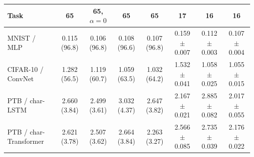 \begin{tabular}{l cccc ccc}
\toprule
Task & \ANPb{} 65 & \ANPb{} 65, $\alpha{=}0$ & \ANP{} 65 & \INP{} 65 & \ANPb{} 17 & \ANP{} 16 & \INP{} 16 \\
\midrule
MNIST / MLP & 0.115 (96.8) & 0.106 (96.8) & 0.108 (96.6) & 0.107 (96.8) & 0.159$\pm$0.007 & 0.112$\pm$0.003 & 0.107$\pm$0.004 \\
CIFAR-10 / ConvNet & 1.282 (56.5) & 1.119 (60.7) & 1.059 (63.5) & 1.032 (64.2) & 1.532$\pm$0.041 & 1.058$\pm$0.025 & 1.055$\pm$0.015 \\
PTB / char-LSTM & 2.660 (3.84) & 2.499 (3.61) & 3.032 (4.37) & 2.647 (3.82) & 2.167$\pm$0.021 & 2.885$\pm$0.082 & 2.017$\pm$0.055 \\
PTB / char-Transformer & 2.621 (3.78) & 2.507 (3.62) & 2.664 (3.84) & 2.263 (3.27) & 2.566$\pm$0.085 & 2.735$\pm$0.039 & 2.176$\pm$0.022 \\
\bottomrule
\end{tabular}
